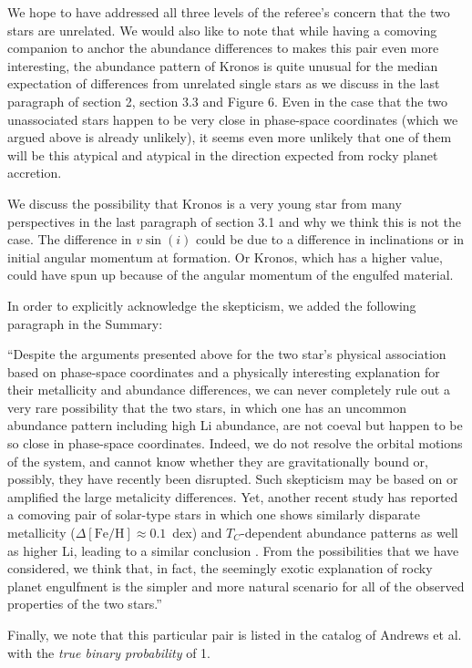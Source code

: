 \documentclass[12pt]{article}
\begin{document}
We hope to have addressed all three levels of the referee's concern that the two
stars are unrelated.
We would also like to note that while having a comoving companion to anchor the
abundance differences to makes this pair even more interesting, the abundance
pattern of Kronos is quite unusual for the median expectation of differences
from unrelated single stars as we discuss in the last paragraph of section 2,
section 3.3 and Figure 6. Even in the case that the two unassociated stars
happen to be very close in phase-space coordinates (which we argued above is
already unlikely), it seems even more unlikely that one of them will be
this atypical and atypical in the direction expected from rocky planet accretion.

We discuss the possibility that Kronos is a very young star from many
perspectives in the last paragraph of section 3.1 and why we think this is not
the case.
The difference in $v\sin(i)$ could be due to a difference in inclinations or 
in initial angular momentum at formation. Or Kronos, which has a higher value,
could have spun up because of the angular momentum of the engulfed material.

In order to explicitly acknowledge the skepticism,
we added the following paragraph in the Summary:

``Despite the arguments presented above for the two star's physical association
based on phase-space coordinates and a physically interesting explanation for
their metallicity and abundance differences, we can never completely rule out
a very rare possibility that the two stars, in which one has
an uncommon abundance pattern including high Li abundance, are not coeval
but happen to be so close in phase-space coordinates.
Indeed, we do not resolve the orbital motions of the system, and cannot know
whether they are gravitationally bound or, possibly, they have recently been
disrupted.
Such skepticism may be based on or amplified the large metalicity
differences.
Yet, another recent study has reported a comoving pair of solar-type stars
in which one shows similarly disparate metallicity ($\Delta[\mathrm{Fe}/\mathrm{H}]
\approx 0.1$~dex) and $T_C$-dependent abundance patterns as well as higher
Li, leading to a similar conclusion \citep{2017A&A...604L...4S}.
From the possibilities that we have considered, we think that, in fact, the
seemingly exotic explanation of rocky planet engulfment is the simpler and more
natural scenario for all of the observed properties of the two stars.''

Finally, we note that this particular pair is listed in the catalog of Andrews et al.
with the \emph{true binary probability} of 1.
\end{document}
